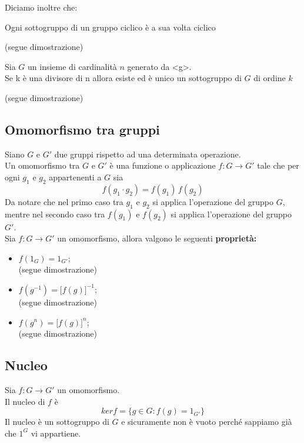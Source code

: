 \begin{flushleft}
Diciamo inoltre che:\\
\begin{proprieta}
Ogni sottogruppo di un gruppo ciclico è a sua volta ciclico
\end{proprieta}
(segue dimostrazione)
\\ \vspace{300px}
\begin{proprieta}
Sia $G$ un insieme di cardinalità $n$ generato da <g>.\\
Se k è una divisore di n allora esiste ed è unico un sottogruppo di $G$ di ordine $k$
\end{proprieta}
(segue dimostrazione)
\\ \vspace{300px}

\subsection{Omomorfismo tra gruppi}
Siano $G$ e $G'$ due gruppi rispetto ad una determinata operazione.\\
Un omomorfismo tra $G$ e $G'$ è una funzione o applicazione $f:G\to G'$ tale che per ogni $g_1$ e $g_2$ appartenenti a $G$ sia
\[f(g_1\cdot g_2) = f(g_1)\,f(g_2)\]
Da notare che nel primo caso tra $g_1$ e $g_2$ si applica l'operazione del gruppo $G$, mentre nel secondo caso tra $f(g_1)$ e $f(g_2)$ si applica l'operazione del gruppo $G'$.\\
Sia $f:G\to G'$ un omomorfismo, allora valgono le seguenti \textbf{proprietà:}
\begin{itemize}
    \item $f(1_G) = 1_{G'}$;\\
    (segue dimostrazione)
    \\ \vspace{300px}
    \item $f(g^{-1}) = \big[f(g)\big]^{-1}$;\\
    (segue dimostrazione)
    \\ \vspace{300px}
    \item  $f(g^{n}) = \big[f(g)\big]^{n}$;\\
    (segue dimostrazione)
    \\ \vspace{300px}
\end{itemize}

\subsection{Nucleo}
Sia $f:G\to G'$ un omomorfismo.\\
Il nucleo di $f$ è
\[ker f = \{g\in G: f(g) = 1_{G'}\}\]
Il nucleo è un sottogruppo di $G$ e sicuramente non è vuoto perché sappiamo già che $1^G$ vi appartiene.




\end{flushleft}

